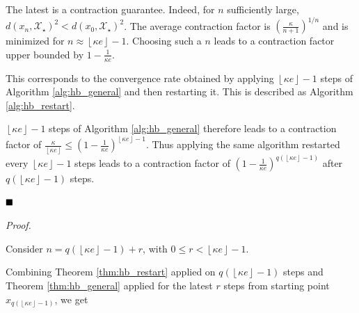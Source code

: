    The latest is a contraction guarantee. Indeed, for $n$ sufficiently large, $d(x_n, \mathcal{X}_\star)^2 < d(x_0, \mathcal{X}_\star)^2$.
    The average contraction factor is $\left(\frac{\kappa}{n+1}\right)^{1/n}$ and is minimized for $n \approx \left\lfloor \kappa e \right\rfloor - 1$. Choosing such a $n$ leads to a contraction factor upper bounded by $1 - \frac{1}{\kappa e}$.
    
    This corresponds to the convergence rate obtained by applying $\left\lfloor \kappa e \right\rfloor - 1$ steps of Algorithm \ref{alg:hb_general} and then restarting it. This is described as Algorithm \ref{alg:hb_restart}.
    
    $\left\lfloor \kappa e \right\rfloor - 1$ steps of Algorithm \ref{alg:hb_general} therefore leads to a contraction factor of $\frac{\kappa}{\left\lfloor \kappa e\right\rfloor} \leq \left(1 - \frac{1}{\kappa e}\right)^{\left\lfloor \kappa e \right\rfloor - 1}$.
    Thus applying the same algorithm restarted every $\left\lfloor \kappa e \right\rfloor - 1$ steps leads to a contraction factor of $\left(1 - \frac{1}{\kappa e}\right)^{q \left(\left\lfloor \kappa e \right\rfloor - 1\right)}$ after $q \left(\left\lfloor \kappa e \right\rfloor - 1\right)$ steps.

$\hfill\blacksquare$

\begin{center}
\end{center}

\noindent \textit{Proof.}

    Consider $n = q \left(\left\lfloor \kappa e \right\rfloor - 1\right) + r$, with $0 \leq r < \left\lfloor \kappa e \right\rfloor - 1$.

    Combining Theorem \ref{thm:hb_restart} applied on $q \left(\left\lfloor \kappa e \right\rfloor - 1\right)$ steps and Theorem \ref{thm:hb_general} applied for the latest $r$ steps from starting point $x_{q \left(\left\lfloor \kappa e \right\rfloor - 1\right)}$, we get
    
